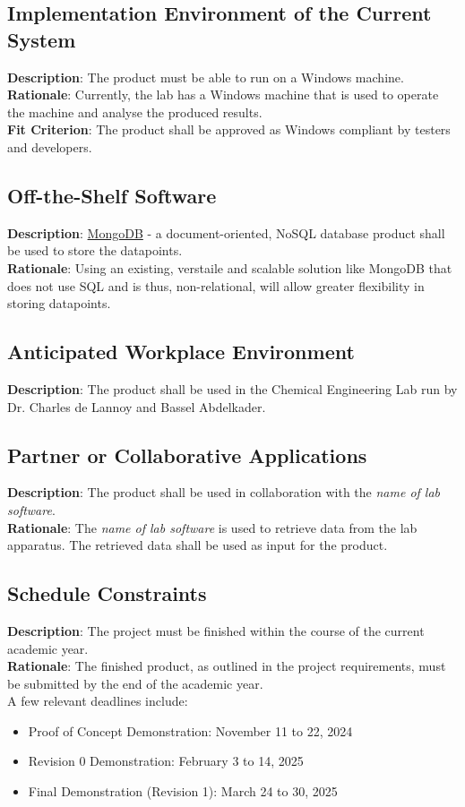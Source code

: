 \documentclass[12pt]{article}
\begin{document}
\subsection{Implementation Environment of the Current System}
\textbf{Description}: The product must be able to run on a Windows machine.\\
\textbf{Rationale}: Currently, the lab has a Windows machine that is used to
operate the machine and analyse the produced results.\\
\textbf{Fit Criterion}: The product shall be approved as Windows compliant by
testers and developers.

\subsection{Off-the-Shelf Software}
\textbf{Description}: \href{https://www.mongodb.com/}{MongoDB} - a
document-oriented, NoSQL database product shall be used to store the
datapoints.\\
\textbf{Rationale}: Using an existing, verstaile and scalable solution like
MongoDB that does not use SQL and is thus, non-relational, will allow greater
flexibility in storing datapoints.\\

\subsection{Anticipated Workplace Environment}
\textbf{Description}: The product shall be used in the Chemical Engineering Lab
run by Dr. Charles de Lannoy and Bassel Abdelkader.

\subsection{Partner or Collaborative Applications}
\textbf{Description}: The product shall be used in collaboration with the
\emph{name of lab software}.\\
\textbf{Rationale}: The \emph{name of lab software} is used to retrieve data
from the lab apparatus. The retrieved data shall be used as input for the
product.

\subsection{Schedule Constraints}
\textbf{Description}: The project must be finished within the course of the
current academic year.\\
\textbf{Rationale}: The finished product, as outlined in the project
requirements, must be submitted by the end of the academic year.\\
\newline
A few relevant deadlines include:
\begin{itemize}
  \item Proof of Concept Demonstration: November 11 to 22, 2024
  \item Revision 0 Demonstration: February 3 to 14, 2025
  \item Final Demonstration (Revision 1): March 24 to 30, 2025
\end{itemize}
\end{document}
